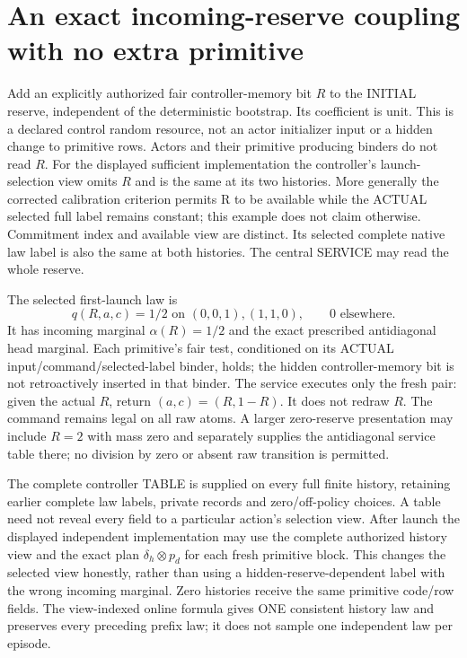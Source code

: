 \documentclass[11pt]{article}
\begin{document}
\section{An exact incoming-reserve coupling with no extra primitive}
Add an explicitly authorized fair controller-memory bit $R$ to the INITIAL reserve, independent of the deterministic bootstrap. Its coefficient is unit. This is a declared control random resource, not an actor initializer input or a hidden change to primitive rows. Actors and their primitive producing binders do not read $R$. For the displayed sufficient implementation the controller's launch-selection view omits $R$ and is the same at its two histories. More generally the corrected calibration criterion permits R to be available while the ACTUAL selected full label remains constant; this example does not claim otherwise. Commitment index and available view are distinct. Its selected complete native law label is also the same at both histories. The central SERVICE may read the whole reserve.

The selected first-launch law is
\[
 q(R,a,c)=1/2\text{ on }(0,0,1),(1,1,0),\qquad 0\text{ elsewhere}.
\]
It has incoming marginal $\alpha(R)=1/2$ and the exact prescribed antidiagonal head marginal. Each primitive's fair test, conditioned on its ACTUAL input/command/selected-label binder, holds; the hidden controller-memory bit is not retroactively inserted in that binder. The service executes only the fresh pair: given the actual $R$, return $(a,c)=(R,1-R)$. It does not redraw $R$. The command remains legal on all raw atoms. A larger zero-reserve presentation may include $R=2$ with mass zero and separately supplies the antidiagonal service table there; no division by zero or absent raw transition is permitted.

The complete controller TABLE is supplied on every full finite history, retaining earlier complete law labels, private records and zero/off-policy choices. A table need not reveal every field to a particular action's selection view. After launch the displayed independent implementation may use the complete authorized history view and the exact plan $\delta_h\otimes p_d$ for each fresh primitive block. This changes the selected view honestly, rather than using a hidden-reserve-dependent label with the wrong incoming marginal. Zero histories receive the same primitive code/row fields. The view-indexed online formula gives ONE consistent history law and preserves every preceding prefix law; it does not sample one independent law per episode.
\end{document}
